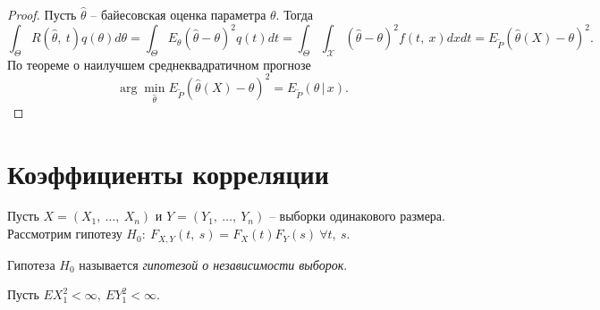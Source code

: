 \begin{proof}
    Пусть $\displaystyle \hat{\theta }$ -- байесовская оценка параметра $\displaystyle \theta $. Тогда
    \begin{equation*}
        \int _{\Theta } R(\hat{\theta } ,\ t) q( \theta ) d\theta =\int _{\Theta } E_{\theta }(\hat{\theta } -\theta )^{2} q( t) dt=\int _{\Theta }\int _{\mathcal{X}}(\hat{\theta } -\theta )^{2} f( t,\ x) dxdt=E_{\tilde{P}}(\hat{\theta }( X) -\theta )^{2} .
    \end{equation*}
    По теореме о наилучшем среднеквадратичном прогнозе
    \begin{equation*}
        \arg\min_{\hat{\theta}}E_{\tilde{P}}(\hat{\theta }( X) -\theta )^{2} = E_{\tilde{P}}(\theta\, \vert\, x).
    \end{equation*}
\end{proof}
\section{Коэффициенты корреляции}

Пусть $\displaystyle X=( X_{1} ,\ \dotsc ,\ X_{n})$ и $\displaystyle Y=( Y_{1} ,\ \dotsc ,\ Y_{n})$ -- выборки одинакового размера. Рассмотрим гипотезу $\displaystyle H_{0} :\ F_{X,Y}( t,\ s) =F_{X}( t) F_{Y}( s) \ \forall t,\ s$.
\begin{definition}
    Гипотеза $\displaystyle H_{0}$ называется \textit{гипотезой о независимости выборок}.
\end{definition}
Пусть $\displaystyle EX_{1}^{2} < \infty ,\ EY_{1}^{2} < \infty $.
